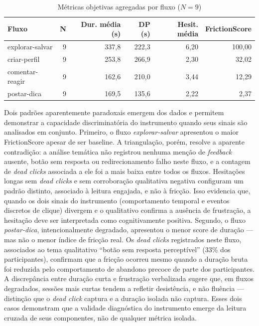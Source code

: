 \documentclass[12pt]{article}
\begin{document}
\begin{table}[htbp]
  \centering
  \caption{Métricas objetivas agregadas por fluxo ($N = 9$)}
  \begin{tabular}{p{3.2cm} r r r r r}
    \toprule
    \textbf{Fluxo} & \textbf{N} & \textbf{Dur. média (s)} & \textbf{DP (s)} & \textbf{Hesit. média} & \textbf{FrictionScore} \\
    \midrule
    explorar-salvar  & 9 & 337,8 & 222,3 & 6,20 & 100,00 \\
    criar-perfil     & 9 & 253,8 & 266,9 & 2,30 &  32,02 \\
    comentar-reagir  & 9 & 162,6 & 210,0 & 3,44 &  12,29 \\
    postar-dica      & 9 & 169,5 & 135,6 & 2,22 &   2,37 \\
    \bottomrule
  \end{tabular}
\end{table}

Dois padrões aparentemente paradoxais emergem dos dados e permitem demonstrar a capacidade discriminatória do instrumento quando seus sinais são analisados em conjunto. Primeiro, o fluxo \textit{explorar-salvar} apresentou o maior FrictionScore apesar de ser baseline. A triangulação, porém, resolve a aparente contradição: a análise temática não registrou nenhuma menção de \textit{feedback} ausente, botão sem resposta ou redirecionamento falho neste fluxo, e a contagem de \textit{dead clicks} associada a ele foi a mais baixa entre todos os fluxos. Hesitações longas sem \textit{dead clicks} e sem corroboração qualitativa negativa configuram um padrão distinto, associado à leitura engajada, e não à fricção. Isso evidencia que, quando os dois sinais do instrumento (comportamento temporal e eventos discretos de clique) divergem e o qualitativo confirma a ausência de frustração, a hesitação deve ser interpretada como cognitivamente positiva. Segundo, o fluxo \textit{postar-dica}, intencionalmente degradado, apresentou o menor score de duração --- mas não o menor índice de fricção real. Os \textit{dead clicks} registrados neste fluxo, associados ao tema qualitativo ``botão sem resposta perceptível'' (33\% dos participantes), confirmam que a fricção ocorreu mesmo quando a duração bruta foi reduzida pelo comportamento de abandono precoce de parte dos participantes. A discrepância entre duração curta e frustração verbalizada sugere que, em fluxos degradados, sessões mais curtas tendem a refletir desistência, e não fluência --- distinção que o \textit{dead click} captura e a duração isolada não captura. Esses dois casos demonstram que a validade diagnóstica do instrumento emerge da leitura cruzada de seus componentes, não de qualquer métrica isolada.
\end{document}

